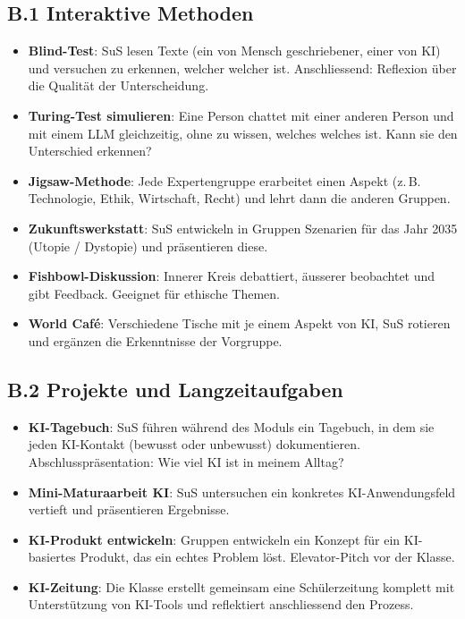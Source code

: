 \subsection*{B.1 Interaktive Methoden}

\begin{itemize}
    \item \textbf{Blind-Test}: SuS lesen Texte (ein von Mensch geschriebener,
          einer von KI) und versuchen zu erkennen, welcher welcher ist.
          Anschliessend: Reflexion über die Qualität der Unterscheidung.
    \item \textbf{Turing-Test simulieren}: Eine Person chattet mit einer
          anderen Person und mit einem LLM gleichzeitig, ohne zu wissen,
          welches welches ist. Kann sie den Unterschied erkennen?
    \item \textbf{Jigsaw-Methode}: Jede Expertengruppe erarbeitet einen
          Aspekt (z.\,B. Technologie, Ethik, Wirtschaft, Recht) und lehrt
          dann die anderen Gruppen.
    \item \textbf{Zukunftswerkstatt}: SuS entwickeln in Gruppen Szenarien
          für das Jahr 2035 (Utopie / Dystopie) und präsentieren diese.
    \item \textbf{Fishbowl-Diskussion}: Innerer Kreis debattiert, äusserer
          beobachtet und gibt Feedback. Geeignet für ethische Themen.
    \item \textbf{World Café}: Verschiedene Tische mit je einem Aspekt
          von KI, SuS rotieren und ergänzen die Erkenntnisse der Vorgruppe.
\end{itemize}

\subsection*{B.2 Projekte und Langzeitaufgaben}

\begin{itemize}
    \item \textbf{KI-Tagebuch}: SuS führen während des Moduls ein Tagebuch,
          in dem sie jeden KI-Kontakt (bewusst oder unbewusst) dokumentieren.
          Abschlusspräsentation: Wie viel KI ist in meinem Alltag?
    \item \textbf{Mini-Maturaarbeit KI}: SuS untersuchen ein konkretes
          KI-Anwendungsfeld vertieft und präsentieren Ergebnisse.
    \item \textbf{KI-Produkt entwickeln}: Gruppen entwickeln ein Konzept
          für ein KI-basiertes Produkt, das ein echtes Problem löst.
          Elevator-Pitch vor der Klasse.
    \item \textbf{KI-Zeitung}: Die Klasse erstellt gemeinsam eine
          Schülerzeitung komplett mit Unterstützung von KI-Tools
          und reflektiert anschliessend den Prozess.
\end{itemize}

